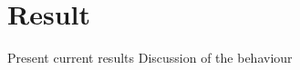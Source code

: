 \chapter{Result}

Present current results
Discussion of the behaviour









 
 


        
    





